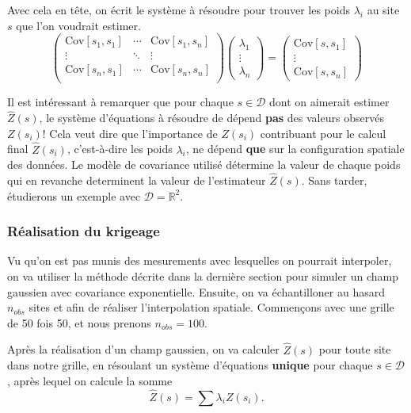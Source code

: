 \documentclass[10pt]{article} %
\begin{document}
Avec cela en tête, on écrit le système à résoudre pour trouver les poids $\lambda_i$ au site $s$ que l'on voudrait estimer.
\begin{equation}
\begin{pmatrix}
    \text{Cov}[s_1, s_1] & \cdots & \text{Cov}[s_1, s_n] \\
    \vdots & \ddots & \vdots \\
    \text{Cov}[s_n, s_1] & \cdots & \text{Cov}[s_n, s_n] \\
\end{pmatrix}
\begin{pmatrix}
    \lambda_1 \\
    \vdots \\
    \lambda_n
\end{pmatrix}
=
\begin{pmatrix}
    \text{Cov}[s, s_1] \\
    \vdots \\
    \text{Cov}[s, s_n]
\end{pmatrix}
\end{equation}

Il est intéressant à remarquer que pour chaque $s \in \mathcal{D}$ dont on aimerait estimer $\hat Z(s)$, le système d'équations à résoudre de dépend
\textbf{pas} des valeurs observés $Z(s_i)$! Cela veut dire que l'importance de $Z(s_i)$ contribuant pour le calcul final $\hat Z(s_i)$, c'est-à-dire les poids $\lambda_i$, ne dépend \textbf{que}
sur la configuration spatiale des données. Le modèle de covariance utilisé détermine la valeur de chaque poids qui en revanche determinent la valeur de l'estimateur
$\hat Z(s)$. Sans tarder, étudierons un exemple avec $\mathcal{D} = \mathbb{R}^2$.

\subsubsection{Réalisation du krigeage}

Vu qu'on est pas munis des mesurements avec lesquelles on pourrait interpoler, on va utiliser la méthode décrite dans la dernière section pour simuler un champ gaussien
avec covariance exponentielle. Ensuite, on va échantilloner au hasard $n_{obs}$ sites et afin de réaliser l'interpolation spatiale. Commen\c cons avec une grille de 50 fois 50,
et nous prenons $n_{obs} = 100$.

Après la réalisation d'un champ gaussien, on va calculer $\hat Z(s)$ pour toute site dans notre grille, en résoulant un système d'équations \textbf{unique} pour chaque $s \in \mathcal{D}$, après
lequel on calcule la somme $$ \hat Z(s) =  \sum \lambda_i Z(s_i).$$
\end{document}
